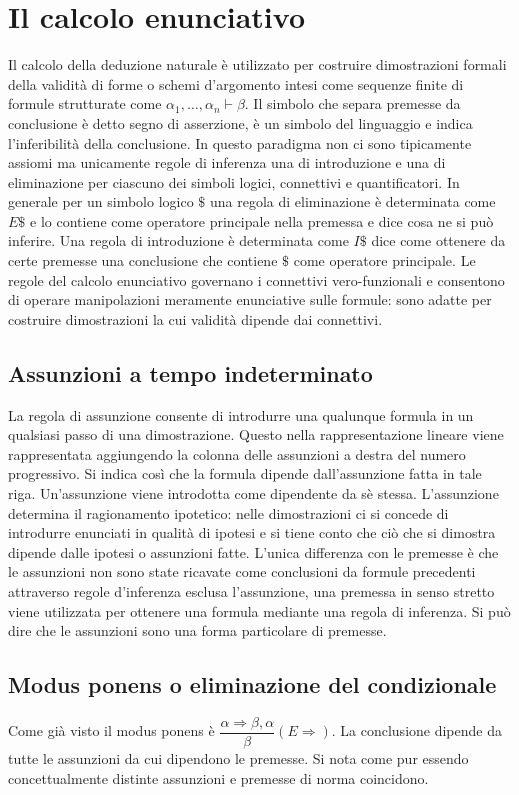 \section{Il calcolo enunciativo}
Il calcolo della deduzione naturale \`e utilizzato per costruire dimostrazioni formali della validit\`a di forme o schemi d'argomento intesi come sequenze finite di formule strutturate come $\alpha_1,\dots,
\alpha_n\vdash\beta$. Il simbolo che separa premesse da conclusione \`e detto segno di asserzione, \`e un simbolo del linguaggio e indica l'inferibilit\`a della conclusione. In questo paradigma non ci sono 
tipicamente assiomi ma unicamente regole di inferenza una di introduzione e una di eliminazione per ciascuno dei simboli logici, connettivi e quantificatori. In generale per un simbolo logico $\$$ una regola di 
eliminazione \`e determinata come $E\$$ e lo contiene come operatore principale nella premessa e dice cosa ne si pu\`o inferire. Una regola di introduzione \`e determinata come $I\$$ dice come ottenere da 
certe premesse una conclusione che contiene $\$$ come operatore principale. Le regole del calcolo enunciativo governano i connettivi vero-funzionali e consentono di operare manipolazioni meramente 
enunciative sulle formule: sono adatte per costruire dimostrazioni la cui validit\`a dipende dai connettivi.
\subsection{Assunzioni a tempo indeterminato}
La regola di assunzione consente di introdurre una qualunque formula in un qualsiasi passo di una dimostrazione. Questo nella rappresentazione lineare viene rappresentata aggiungendo la colonna delle 
assunzioni a destra del numero progressivo. Si indica cos\`i che la formula dipende dall'assunzione fatta in tale riga. Un'assunzione viene introdotta come dipendente da s\`e stessa. L'assunzione determina il 
ragionamento ipotetico: nelle dimostrazioni ci si concede di introdurre enunciati in qualit\`a di ipotesi e si tiene conto che ci\`o che si dimostra dipende dalle ipotesi o assunzioni fatte. L'unica differenza con le 
premesse \`e che le assunzioni non sono state ricavate come conclusioni da formule precedenti attraverso regole d'inferenza esclusa l'assunzione, una premessa in senso stretto viene utilizzata per ottenere una 
formula mediante una regola di inferenza. Si pu\`o dire che le assunzioni sono una forma particolare di premesse. 
\subsection{Modus ponens o eliminazione del condizionale}
Come gi\`a visto il modus ponens \`e $\dfrac{\alpha\Rightarrow\beta, \alpha}{\beta}(E\Rightarrow)$. La conclusione dipende da tutte le assunzioni da cui dipendono le premesse. Si nota come pur essendo 
concettualmente distinte assunzioni e premesse di norma coincidono.
